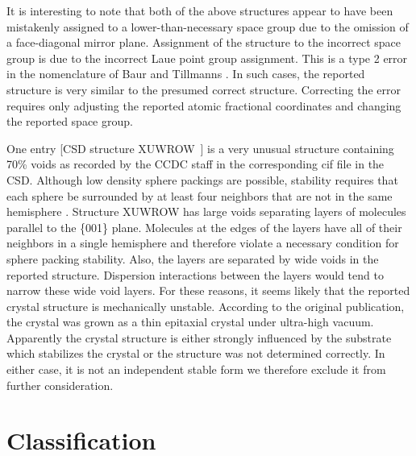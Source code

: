 \documentclass[preprint]{iucr}              %
\begin{document}
It is interesting to note that both of the above structures appear to have been mistakenly assigned to a lower-than-necessary space group due to the omission of a face-diagonal mirror plane.  Assignment of the structure to the incorrect space group is due to the incorrect Laue point group assignment.  This is a type 2 error in the nomenclature of Baur and Tillmanns \cite{Baur86}.  In such cases, the reported structure is very similar to the presumed correct structure.  Correcting the error requires only adjusting the reported atomic fractional coordinates and changing the reported space group.

One entry [CSD structure XUWROW~\cite{Sung02}] is a very unusual structure containing 70\% voids as recorded by the CCDC staff in the corresponding cif file in the CSD.  Although low density sphere packings are possible, stability requires that each sphere be surrounded by at least four neighbors that are not in the same hemisphere \cite{Conway98}.  Structure XUWROW has large voids separating layers of molecules parallel to the \{001\} plane.  Molecules at the edges of the layers have all of their neighbors in a single hemisphere and therefore violate a necessary condition for sphere packing stability.  Also, the layers are separated by wide voids in the reported structure.  Dispersion interactions between the layers would tend to narrow these wide void layers.  For these reasons, it seems likely that the reported crystal structure is mechanically unstable.  According to the original publication, the crystal was grown as a thin epitaxial crystal under ultra-high vacuum.  Apparently the crystal structure is either strongly influenced by the substrate which stabilizes the crystal or the structure was not determined correctly.  In either case, it is not an independent stable form we therefore exclude it from further consideration.


\section{Classification}
\label{sec:Classification}
\end{document}
